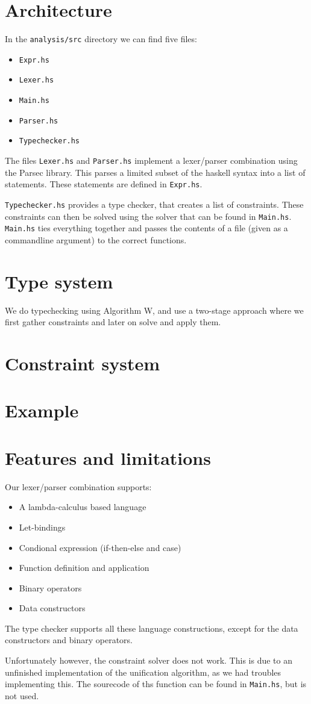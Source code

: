 \documentclass[10pt]{article}
\title{}
\author{Frank Dedden \and Wilco Kusee}
\begin{document}
\maketitle

\section{Architecture}
In the \texttt{analysis/src} directory we can find five files:
\begin{itemize}
	\item \texttt{Expr.hs}
	\item \texttt{Lexer.hs}
	\item \texttt{Main.hs}
	\item \texttt{Parser.hs}
	\item \texttt{Typechecker.hs}
\end{itemize}
The files \texttt{Lexer.hs} and \texttt{Parser.hs} implement a lexer/parser combination using the Parsec library. This parses a limited subset of the haskell syntax into a list of statements. These statements are defined in \texttt{Expr.hs}.

\texttt{Typechecker.hs} provides a type checker, that creates a list of constraints. These constraints can then be solved using the solver that can be found in \texttt{Main.hs}. \texttt{Main.hs} ties everything together and passes the contents of a file (given as a commandline argument) to the correct functions.


\section{Type system}
We do typechecking using Algorithm W, and use a two-stage approach where we first gather constraints and later on solve and apply them.

\section{Constraint system}


\section{Example}


\section{Features and limitations}
Our lexer/parser combination supports:
\begin{itemize}
	\item A lambda-calculus based language
	\item Let-bindings
	\item Condional expression (if-then-else and case)
	\item Function definition and application
	\item Binary operators
	\item Data constructors
\end{itemize}
The type checker supports all these language constructions, except for the data constructors and binary operators.

Unfortunately however, the constraint solver does not work. This is due to an unfinished implementation of the unification algorithm, as we had troubles implementing this. The sourecode of ths function can be found in \texttt{Main.hs}, but is not used.
\end{document}
